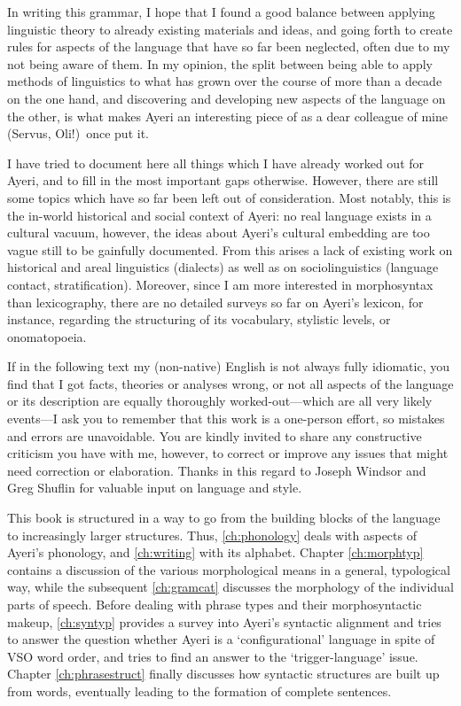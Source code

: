 In writing this grammar, I hope that I found a good balance between applying
linguistic theory to already existing materials and ideas, and going forth to
create rules for aspects of the language that have so far been neglected, often
due to my not being aware of them. In my opinion, the split between being able
to apply methods of linguistics to what has grown over the course of more than
a decade on the one hand, and discovering and developing new aspects of the
language on the other, is what makes Ayeri an interesting piece of
 as a dear colleague of mine (Servus, Oli!)\
once put it.

I have tried to document here all things which I have already worked out for
Ayeri, and to fill in the most important gaps otherwise. However, there are
still some topics which have so far been left out of consideration. Most
notably, this is the in-world historical and social context of Ayeri: no real
language exists in a cultural vacuum, however, the ideas about Ayeri's cultural
embedding are too vague still to be gainfully documented. From this arises a
lack of existing work on historical and areal linguistics (dialects) as well as
on sociolinguistics (language contact, stratification). Moreover, since I am
more interested in morphosyntax than lexicography, there are no detailed
surveys so far on Ayeri's lexicon, for instance, regarding the structuring of
its vocabulary, stylistic levels, or onomatopoeia.

If in the following text my (non-native) English is not always fully idiomatic,
you find that I got facts, theories or analyses wrong, or not all aspects of
the language or its description are equally thoroughly worked-out---which are
all very likely events---I ask you to remember that this work is a one-person
effort, so mistakes and errors are unavoidable. You are kindly invited to share
any constructive criticism you have with me, however, to correct or improve any
issues that might need correction or elaboration. Thanks in this regard to
Joseph Windsor and Greg Shuflin for valuable input on language and style.

This book is structured in a way to go from the building blocks of the language
to increasingly larger structures. Thus, \autoref{ch:phonology} deals with
aspects of Ayeri's phonology, and \autoref{ch:writing} with its alphabet.
Chapter \ref{ch:morphtyp} contains a discussion of the various morphological
means in a general, typological way, while the subsequent \autoref{ch:gramcat}
discusses the morphology of the individual parts of speech. Before dealing with
phrase types and their morphosyntactic makeup, \autoref{ch:syntyp} provides a
survey into Ayeri's syntactic alignment and tries to answer the question
whether Ayeri is a `configurational' language in spite of VSO word order, and
tries to find an answer to the `trigger-language' issue. Chapter
\ref{ch:phrasestruct} finally discusses how syntactic structures are built up
from words, eventually leading to the formation of complete sentences.
